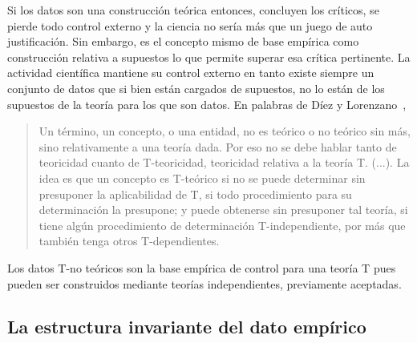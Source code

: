\documentclass[a4paper,11pt]{book}
\theoremstyle{definition}
\begin{document}

Si los datos son una construcción teórica entonces, concluyen los críticos, se pierde todo control externo y la ciencia no sería más que un juego de auto justificación.
%
Sin embargo, es el concepto mismo de base empírica como construcción relativa a supuestos lo que permite superar esa crítica pertinente.
%
La actividad científica mantiene su control externo en tanto existe siempre un conjunto de datos que si bien están cargados de supuestos, no lo están de los supuestos de la teoría para los que son datos.
%
En palabras de Díez y Lorenzano~\cite{lorenzano2002-concepcionEstructuralista},
%
\begin{quotation}
Un término, un concepto, o una entidad, no es teórico o no teórico sin más, sino relativamente a una teoría dada.
Por eso no se debe hablar tanto de teoricidad cuanto de T-teoricidad, teoricidad relativa a la teoría T. (...).
La idea es que un concepto es T-teórico si no se puede determinar sin presuponer la aplicabilidad de T, si todo procedimiento para su determinación la presupone; y puede obtenerse sin presuponer tal teoría, si tiene algún procedimiento de determinación T-independiente, por más que también tenga otros T-dependientes.
\end{quotation}
%
Los datos T-no teóricos son la base empírica de control para una teoría T pues pueden ser construidos mediante teorías independientes, previamente aceptadas.




\subsection{La estructura invariante del dato empírico} \label{sec:estructura_invariante}
\end{document}
